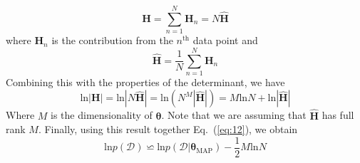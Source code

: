 \documentclass{article}
\begin{document}
	\begin{equation}
	\mathbf{H} = \sum\limits_{n=1}^{N}\mathbf{H}_n=N\widehat{\mathbf{H}}
	\end{equation}
	where $\mathbf{H}_n$ is the contribution from the $n^{\text{th}}$ data point and
	\begin{equation}
	\widehat{\mathbf{H}} = \frac{1}{N}\sum\limits_{n=1}^{N}\mathbf{H}_n
	\end{equation}
	Combining this with the properties of the determinant, we have 
	\begin{equation}
	\text{ln}|\mathbf{H}| = \text{ln}|N\widehat{\mathbf{H}}| = \text{ln}\left(N^M|\widehat{\mathbf{H}}|\right) = M\text{ln}N + \text{ln}|\widehat{\mathbf{H}}|
	\end{equation}
	Where $M$ is the dimensionality of $\boldsymbol{\theta}$. Note that we are assuming that $\widehat{\mathbf{H}}$ has full rank $M$. Finally, using this result together Eq.~(\ref{eq:12}), we obtain 
	\begin{equation}
	\text{ln}p(\mathcal{D}) \backsimeq \text{ln}p(\mathcal{D}|\boldsymbol{\theta}_{\text{MAP}}) - \frac{1}{2}M\text{ln}N
	\end{equation}
    
\end{document}
